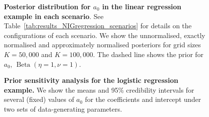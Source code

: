 \documentclass[a4paper, notitlepage, 11pt]{article}
\begin{document}
\begin{figure}[!ht]
\begin{center}
\hfill
\end{center}
\caption{\textbf{Posterior distribution for $a_0$  in the linear regression example in each scenario}.
See Table~\ref{tab:results_NIGregression_scenarios} for details on the configurations of each scenario.
We show the unnormalised, exactly normalised and approximately normalised posteriors for grid sizes $K = 50, 000$ and $K = 100, 000$.
The dashed line shows the prior for $a_0$, $\operatorname{Beta}(\eta = 1, \nu = 1)$.
}
\label{sfig:a0_posterior_NIGRegression_scenarios}
\end{figure}


\begin{figure}[!ht]
\begin{center}
 \hfill
{}
\hfill
{}
\end{center}
\caption{\textbf{Prior sensitivity analysis for the logistic regression example. 
}
We show the means and 95\% credibility intervals for several (fixed) values of $a_0$  for the coefficients and intercept under two sets of data-generating parameters.
}
\label{sfig:sensitivity_logistic_regression}
\end{figure}
\end{document}
